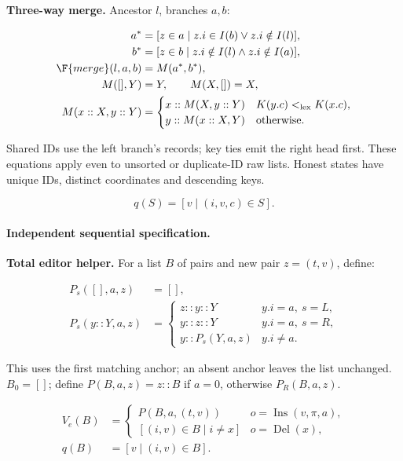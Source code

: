 \textbf{Three-way merge.} Ancestor $l$, branches $a,b$:

\[
\begin{aligned}a^*&=[z\in a\mid z.i\in I(b)\lor z.i\notin I(l)],\\b^*&=[z\in b\mid z.i\notin I(l)\land z.i\notin I(a)],\\\F{merge}(l,a,b)&=M(a^*,b^*),\\M([],Y)&=Y,\qquad M(X,[])=X,\\M(x::X,y::Y)&=\begin{cases}x::M(X,y::Y)&K(y.c)<_{\rm lex}K(x.c),\\y::M(x::X,Y)&\text{otherwise}.\end{cases}\end{aligned}
\]


Shared IDs use the left branch's records; key ties emit the right head first. These equations apply even to unsorted or duplicate-ID raw lists. Honest states have unique IDs, distinct coordinates and descending keys.

\[
q(S)=[v\mid(i,v,c)\in S].
\]

\paragraph{Independent sequential specification.}
\textbf{Total editor helper.} For a list $B$ of pairs and new pair $z=(t,v)$, define:

\[
\begin{aligned}P_s([],a,z)&=[],\\P_s(y::Y,a,z)&=\begin{cases}z::y::Y&y.i=a,\ s=L,\\y::z::Y&y.i=a,\ s=R,\\y::P_s(Y,a,z)&y.i\ne a.\end{cases}\end{aligned}
\]


This uses the first matching anchor; an absent anchor leaves the list unchanged. $B_0=[]$; define $P(B,a,z)=z::B$ if $a=0$, otherwise $P_R(B,a,z)$.

\[
\begin{aligned}V_e(B)&=\begin{cases}P(B,a,(t,v))&o=\operatorname{Ins}(v,\pi,a),\\{}[(i,v)\in B\mid i\ne x]&o=\operatorname{Del}(x),\end{cases}\\q(B)&=[v\mid(i,v)\in B].\end{aligned}
\]


